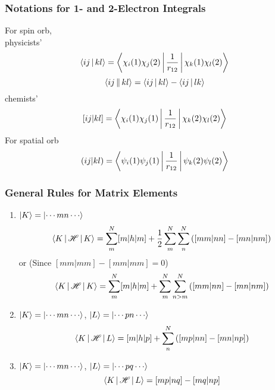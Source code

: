 \documentclass[a4paper]{article}
\numberwithin{equation}{section}
\begin{document}
\subsubsection{Notations for 1- and 2-Electron Integrals}
For spin orb,\\
physicists'
\begin{equation}\label{key}
\Braket{ij|kl} = \Braket{\chi_i(1)\chi_j(2) | \dfrac{1}{r_{12}} | \chi_k(1)\chi_l(2)}
\end{equation}
\begin{equation}\label{key}
\Braket{ij||kl} = \Braket{ij|kl} - \Braket{ij|lk}
\end{equation}
chemists'
\begin{equation}\label{key}
[ij|kl] = \Braket{\chi_i(1)\chi_j(1) | \dfrac{1}{r_{12}} | \chi_k(2)\chi_l(2)}
\end{equation}
For spatial orb
\begin{equation}\label{key}
(ij|kl) = \Braket{\psi_i(1)\psi_j(1) | \dfrac{1}{r_{12}} | \psi_k(2)\psi_l(2)}
\end{equation}

\subsubsection{General Rules for Matrix Elements}
\begin{enumerate}
	\item $ \ket{K} = \ket{\cdots m n\cdots} $
	\begin{equation}\label{key}
	\Braket{K | \mathscr{H} | K} = \sum_m^N [m|h|m] + \dfrac{1}{2}\sum_m^N\sum_n^N \qty([mm|nn] - [mn|nm])
	\end{equation}
	or (Since $ [mm|mm] - [mm|mm] = 0 $)
	\begin{equation}\label{key}
	\Braket{K | \mathscr{H} | K} = \sum_m^N [m|h|m] + \sum_m^N\sum_{n>m}^N \qty([mm|nn] - [mn|nm])
	\end{equation}
	\item $ \ket{K} = \ket{\cdots m n\cdots} $, $ \ket{L} = \ket{\cdots p n\cdots} $
	\begin{equation}\label{key}
	\Braket{K | \mathscr{H} | L} = [m|h|p] + \sum_n^N \qty([mp|nn] - [mn|np])
	\end{equation}
	\item $ \ket{K} = \ket{\cdots m n\cdots} $, $ \ket{L} = \ket{\cdots p q\cdots} $
	\begin{equation}\label{key}
	\Braket{K | \mathscr{H} | L} = [mp|nq] - [mq|np]
	\end{equation}
\end{enumerate}
\end{document}
